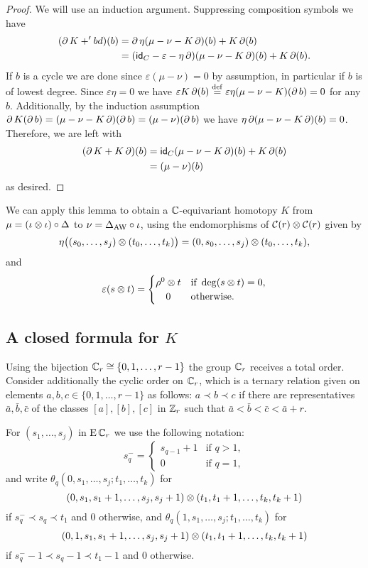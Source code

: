 \begin{proof}
	We will use an induction argument.
	Suppressing composition symbols we have
	\begin{align*}
		(\operatorname{\partial} K+ 'bd)(b)
		&= \operatorname{\partial} \eta(\mu-\nu-K\operatorname{\partial})(b) + K\operatorname{\partial}(b) \\
		&= (\mathsf{id}_C - \varepsilon - \eta\operatorname{\partial})(\mu-\nu - K\operatorname{\partial})(b) + K\operatorname{\partial}(b).
	\end{align*}
	If $b$ is a cycle we are done since $\varepsilon(\mu-\nu) = 0$ by assumption, in particular if $b$ is of lowest degree.
	Since $\varepsilon \eta = 0$ we have $\varepsilon K \operatorname{\partial}(b) \stackrel{\mathrm{def}}{=} \varepsilon \eta(\mu-\nu-K)(\operatorname{\partial} b) = 0$ for any $b$.
	Additionally, by the induction assumption $\operatorname{\partial} K (\operatorname{\partial} b) = (\mu-\nu-K\operatorname{\partial})(\operatorname{\partial} b) = (\mu-\nu)(\operatorname{\partial} b)$ we have $\eta \operatorname{\partial} (\mu-\nu - K\operatorname{\partial})(b) = 0$.
	Therefore, we are left with
	\begin{align*}
		(\operatorname{\partial} K+ K\operatorname{\partial})(b) &=
		\mathsf{id}_C(\mu-\nu-K\operatorname{\partial})(b)+K\operatorname{\partial}(b) \\&=
		(\mu-\nu)(b)
	\end{align*}
	as desired.
\end{proof}

We can apply this lemma to obtain a $\mathbb{C}$-equivariant homotopy $K$ from $\mu = (\iota \otimes \iota) \circ \Delta$ to $\nu = \Delta_{\operatorname{AW}} \circ \iota$, using the endomorphisms of $\mathcal{C}(r) \otimes \mathcal{C}(r)$ given by
\[
\eta \big((s_0,\dots,s_j) \otimes (t_0,\dots,t_k)\big) = (0,s_0,\dots,s_j) \otimes (t_0,\dots,t_k),
\]
and
\[
\varepsilon(s \ot t) =
\begin{cases}
	\rho^0 \ot t & \text{if } \deg(s \ot t) = 0, \\
	\hfil0 & \text{otherwise}.
\end{cases}
\]

\subsection{A closed formula for $K$}\label{ss:closed formula for K}

Using the bijection $\mathbb{C}_r\cong\{0,1,\dots,r-1\}$ the group $\mathbb{C}_r$ receives a total order.
Consider additionally the cyclic order on $\mathbb{C}_r$, which is a ternary relation given on elements $a,b,c\in \{0,1,\dots,r-1\}$ as follows: $a\prec b\prec c$
if there are representatives $\bar{a},\bar{b},\bar{c}$ of the classes $[a],[b],[c]$ in $\mathbb{Z}_r$ such that $\bar{a}<\bar{b}<\bar{c}<\bar{a}+r$.

For $(s_1,\dots,s_j)$ in $\operatorname{E}\mathbb{C}_r$ we use the following notation:
\[
s_q^- =
\begin{cases}
	s_{q-1}+1 & \text{if } q>1, \\
	0 & \text{if } q=1,
\end{cases}
\]
and write $\theta_q(0,s_1,\dots,s_j;t_1,\dots,t_k)$ for
\[
(0,s_1,s_1+1,\dots,s_j,s_j+1)\otimes (t_1,t_1+1,\dots,t_k,t_k+1)
\]
if $s_q^- \prec s_q \prec t_1$ and $0$ otherwise, and $\theta_q(1,s_1,\dots,s_j;t_1,\dots,t_k)$ for
\[
(0,1,s_1,s_1+1,\dots,s_j,s_j+1)\otimes (t_1,t_1+1,\dots,t_k,t_k+1)
\]
if $s_q^--1 \prec s_q-1 \prec t_1-1$ and $0$ otherwise.

